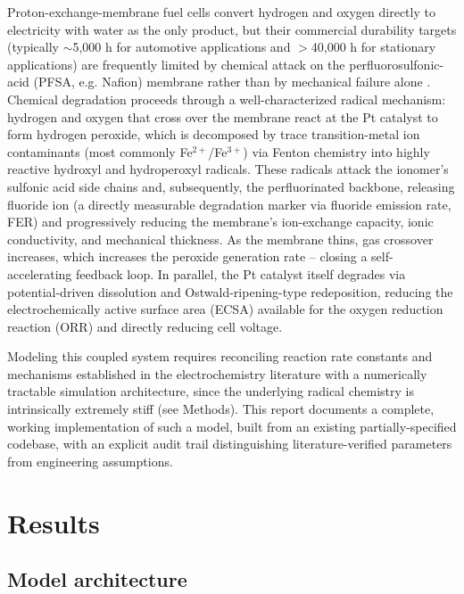 \documentclass[10pt,twocolumn]{article}
\begin{document}
Proton-exchange-membrane fuel cells convert hydrogen and oxygen directly
to electricity with water as the only product, but their commercial
durability targets (typically $\sim$5,000 h for automotive applications
and $>$40,000 h for stationary applications) are frequently limited by
chemical attack on the perfluorosulfonic-acid (PFSA, e.g. Nafion)
membrane rather than by mechanical failure alone
\citep{kreuer2004,kusoglu2017}. Chemical degradation proceeds through a
well-characterized radical mechanism: hydrogen and oxygen that cross over
the membrane react at the Pt catalyst to form hydrogen peroxide, which is
decomposed by trace transition-metal ion contaminants (most commonly
Fe$^{2+}$/Fe$^{3+}$) via Fenton chemistry into highly reactive hydroxyl
and hydroperoxyl radicals. These radicals attack the ionomer's sulfonic
acid side chains and, subsequently, the perfluorinated backbone,
releasing fluoride ion (a directly measurable degradation marker via
fluoride emission rate, FER) and progressively reducing the membrane's
ion-exchange capacity, ionic conductivity, and mechanical thickness. As
the membrane thins, gas crossover increases, which increases the peroxide
generation rate -- closing a self-accelerating feedback loop. In parallel,
the Pt catalyst itself degrades via potential-driven dissolution and
Ostwald-ripening-type redeposition, reducing the electrochemically active
surface area (ECSA) available for the oxygen reduction reaction (ORR) and
directly reducing cell voltage.

Modeling this coupled system requires reconciling reaction rate
constants and mechanisms established in the electrochemistry literature
with a numerically tractable simulation architecture, since the
underlying radical chemistry is intrinsically extremely stiff (see
Methods). This report documents a complete, working implementation of
such a model, built from an existing partially-specified codebase, with
an explicit audit trail distinguishing literature-verified parameters
from engineering assumptions.

\section{Results}

\subsection{Model architecture}
\end{document}
